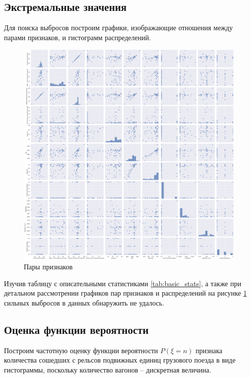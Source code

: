 \subsection{Экстремальные значения}

Для поиска выбросов построим графики, изображающие отношения между парами признаков, и гистограмм распределений.\\

\begin{figure}[H]
\begin{center}
\includegraphics[width=0.8\linewidth]{src/img/pair_plot.png}
\caption{Пары признаков}
\label{fig:pair_plot}
\end{center}
\end{figure}

Изучив таблицу с описательными статистиками \ref{tab:basic_stats}, а также при детальном рассмотрении графиков пар признаков и распределений на рисунке \ref{fig:pair_plot} сильных выбросов в данных обнаружить не удалось.



\subsection{Оценка функции вероятности}

Построим частотную оценку функции вероятности $P(\xi = n)$ признака количества сошедших с рельсов подвижных единиц грузового поезда в виде гистограммы, поскольку количество вагонов -- дискретная величина.

